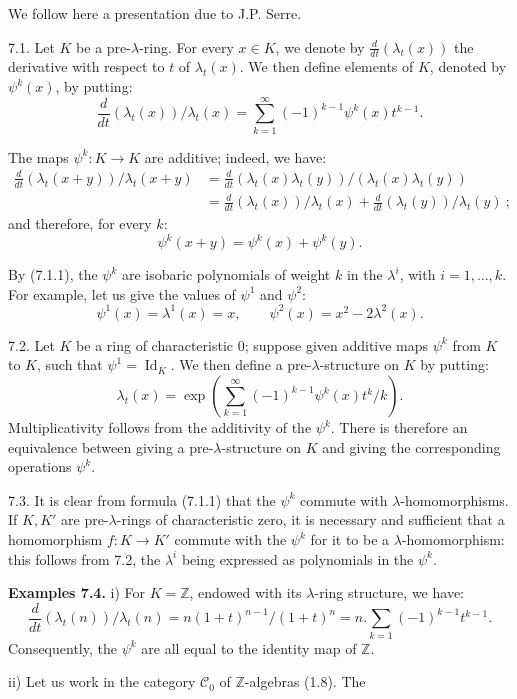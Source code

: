 We follow here a presentation due to J.P. Serre.

7.1. Let \(K\) be a pre-\(\lambda\)-ring. For every \(x\in K\), we denote by \(\frac{d}{dt}(\lambda_t(x))\) the derivative with respect to \(t\) of \(\lambda_t(x)\). We then define elements of \(K\), denoted by \(\psi^k(x)\), by putting:
\begin{equation}\tag{7.1.1}
  \frac{d}{dt}(\lambda_t(x))/\lambda_t(x)
  =
  \sum_{k=1}^{\infty}(-1)^{k-1}\psi^k(x)t^{k-1}.
\end{equation}

The maps \(\psi^k:K\to K\) are additive; indeed, we have:
\[
\begin{aligned}
 \frac{d}{dt}(\lambda_t(x+y))/\lambda_t(x+y)
 &=
 \frac{d}{dt}(\lambda_t(x)\lambda_t(y))/(\lambda_t(x)\lambda_t(y))\\
 &=
 \frac{d}{dt}(\lambda_t(x))/\lambda_t(x)
 +\frac{d}{dt}(\lambda_t(y))/\lambda_t(y)\ ;
\end{aligned}
\]
%
and therefore, for every \(k\):
\[
  \psi^k(x+y)=\psi^k(x)+\psi^k(y).
\]

By (7.1.1), the \(\psi^k\) are isobaric polynomials of weight \(k\) in the \(\lambda^i\), with \(i=1,\ldots,k\). For example, let us give the values of \(\psi^1\) and \(\psi^2\):
\[
  \psi^1(x)=\lambda^1(x)=x,
  \qquad
  \psi^2(x)=x^2-2\lambda^2(x).
\]

7.2. Let \(K\) be a ring of characteristic \(0\); suppose given additive maps \(\psi^k\) from \(K\) to \(K\), such that \(\psi^1=\operatorname{Id}_K\). We then define a pre-\(\lambda\)-structure on \(K\) by putting:
\begin{equation}\tag{7.2.1}
  \lambda_t(x)=
  \exp\left(\sum_{k=1}^{\infty}(-1)^{k-1}\psi^k(x)t^k/k\right).
\end{equation}
Multiplicativity follows from the additivity of the \(\psi^k\). There is therefore an equivalence between giving a pre-\(\lambda\)-structure on \(K\) and giving the corresponding operations \(\psi^k\).

7.3. It is clear from formula (7.1.1) that the \(\psi^k\) commute with \(\lambda\)-homomorphisms. If \(K,K'\) are pre-\(\lambda\)-rings of characteristic zero, it is necessary and sufficient that a homomorphism \(f:K\to K'\) commute with the \(\psi^k\) for it to be a \(\lambda\)-homomorphism: this follows from 7.2, the \(\lambda^i\) being expressed as polynomials in the \(\psi^k\).

\textbf{Examples 7.4.} i) For \(K=\mathbb Z\), endowed with its \(\lambda\)-ring structure, we have:
\[
  \frac{d}{dt}(\lambda_t(n))/\lambda_t(n)
  =
  n(1+t)^{n-1}/(1+t)^n
  =
  n.\sum_{k=1}(-1)^{k-1}t^{k-1}.
\]
Consequently, the \(\psi^k\) are all equal to the identity map of \(\mathbb Z\).

ii) Let us work in the category \(\mathcal C_0\) of \(\mathbb Z\)-algebras (1.8). The
